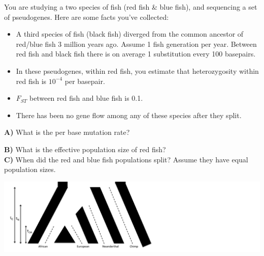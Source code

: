 \begin{question} {}
You are studying a two species of fish (red fish \& blue fish), and
sequencing a set of pseudogenes.  Here are some facts you've collected:
 \begin{itemize}
 \item A third species of fish (black fish) diverged from
 the common ancestor of red/blue fish 3 million years ago. 
 Assume 1 fish generation per year. Between red fish and black fish there is
 on average 1 substitution every 100 basepairs. 
 \item In these pseudogenes, within red fish, you estimate that heterozygosity within
 red fish is $10^{-4}$ per basepair. 
 \item $F_{ST}$ between red fish and blue fish is 0.1.
 \item There has been no gene flow among any of these species after
   they split.
 \end{itemize}
{\bf A)} What is the per base mutation rate?

{\bf B)} What is the effective population size of red fish?\\

{\bf C)} When did the red and blue fish populations split? Assume they
have equal population sizes. 
\end{question}


  \begin{marginfigure}
  \begin{center}
    \includegraphics[width= \textwidth]{figures/Genetic_drift/ILS/ABBA_chimp_out.pdf}
  \end{center}
  \caption{ A simple population tree diagram, not to scale, of human
    populations and Neanderthals. Assume, for the sake of the question, that there is no gene flow
between populations after they split. Assume that the African and European populations split $\sim$100 thousand years
ago ($t_{OA}$). Neanderthals split from the modern human populations $\sim$700
thousand years ago ($t_N$). The population ancestral to humans and
chimps split 6.5 Million years ago ($t_C$).} \label{fig:ABBA_Neanderthal}
\end{marginfigure}
  
